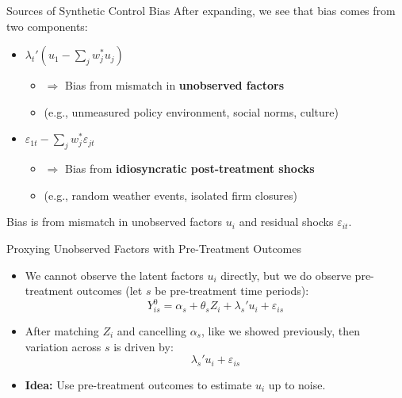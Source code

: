 \documentclass{beamer}
\begin{document}
\begin{frame}{Sources of Synthetic Control Bias}
  After expanding, we see that bias comes from two components:
  \vspace{0.5cm}
  \begin{itemize}
    \item $\lambda_t' (u_1 - \sum_j w_j^* u_j)$
    \begin{itemize}
      \item $\Rightarrow$ Bias from mismatch in \textbf{unobserved factors} 
      \item (e.g., unmeasured policy environment, social norms, culture)
    \end{itemize}
    \item $\varepsilon_{1t} - \sum_j w_j^* \varepsilon_{jt}$
    \begin{itemize}
      \item $\Rightarrow$ Bias from \textbf{idiosyncratic post-treatment shocks}
      \item (e.g., random weather events, isolated firm closures)
    \end{itemize}

  \end{itemize}
 Bias is from mismatch in unobserved factors $u_i$ and residual shocks $\varepsilon_{it}$.
\end{frame}


\begin{frame}{Proxying Unobserved Factors with Pre-Treatment Outcomes}
  \small
  \begin{itemize}
    \item We cannot observe the latent factors $u_i$ directly, but we do observe pre-treatment outcomes (let $s$ be pre-treatment time periods):
    \[
    Y_{is}^0 = \alpha_s + \theta_s Z_i + \lambda_s' u_i + \varepsilon_{is}
    \]
    \item After matching $Z_i$ and cancelling $\alpha_s$, like we showed previously, then variation across $s$ is driven by:
    \[
    \lambda_s' u_i + \varepsilon_{is}
    \]
    \item \textbf{Idea:} Use pre-treatment outcomes to estimate $u_i$ up to noise.
  \end{itemize}
\end{frame}
\end{document}
